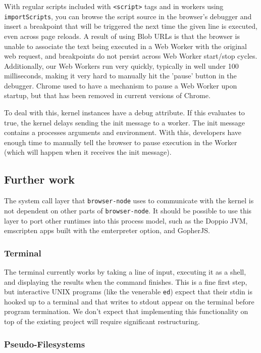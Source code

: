 \documentclass{acm_proc_article-sp}
\begin{document}
With regular scripts included with \texttt{<script>} tags and in
workers using \texttt{importScripts}, you can browse the script source
in the browser's debugger and insert a breakpoint that will be
triggered the next time the given line is executed, even across page
reloads.  A result of using Blob URLs is that the browser is unable to
associate the text being executed in a Web Worker with the original
web request, and breakpoints do not persist across Web Worker
start/stop cycles.  Additionally, our Web Workers run very quickly,
typically in well under 100 milliseconds, making it very hard to
manually hit the 'pause' button in the debugger.  Chrome used to have
a mechanism to pause a Web Worker upon startup, but that has been
removed in current versions of Chrome.

To deal with this, kernel instances have a debug attribute.  If this
evaluates to true, the kernel delays sending the init message to a
worker.  The init message contains a processes arguments and
environment.  With this, developers have enough time to manually tell
the browser to pause execution in the Worker (which will happen when
it receives the init message).

\subsection{Further work}

The system call layer that \texttt{browser-node} uses to communicate
with the kernel is not dependent on other parts of
\texttt{browser-node}.  It should be possible to use this layer to
port other runtimes into this process model, such as the Doppio JVM,
emscripten apps built with the emterpreter option, and GopherJS.

\subsubsection{Terminal}

The terminal currently works by taking a line of input, executing it
as a shell, and displaying the results when the command finishes.
This is a fine first step, but interactive UNIX programs (like the
venerable \texttt{ed}) expect that their stdin is hooked up to a
terminal and that writes to stdout appear on the terminal before
program termination.  We don't expect that implementing this
functionality on top of the existing project will require significant
restructuring.

\subsubsection{Pseudo-Filesystems}
\end{document}
